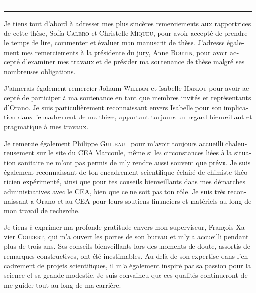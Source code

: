 \begin{otherlanguage}{french}

\hrule\relax
\vspace*{.9\baselineskip}%
\raggedright{\huge{}}\par%
\vspace*{1.1\baselineskip}%
\hrule\relax
\vspace*{\baselineskip}%
\thispagestyle{empty}

\begingroup
\itshape

Je tiens tout d'abord à adresser mes plus sincères remerciements aux rapportrices de cette thèse, Sof{\'{i}}a \textsc{Calero} et Christelle \textsc{Miqueu}, pour avoir accepté de prendre le temps de lire, commenter et évaluer mon manuscrit de thèse.
J'adresse également mes remerciements à la présidente du jury, Anne \textsc{Boutin}, pour avoir accepté d'examiner mes travaux et de présider ma soutenance de thèse malgré ses nombreuses obligations.

J'aimerais également remercier Johann \textsc{William} et Isabelle \textsc{Hablot} pour avoir accepté de participer à ma soutenance en tant que membres invités et représentants d'Orano. Je suis particulièrement reconnaissant envers Isabelle pour son implication dans l'encadrement de ma thèse, apportant toujours un regard bienveillant et pragmatique à mes travaux.

Je remercie également Philippe \textsc{Guilbaud} pour m'avoir toujours accueilli chaleureusement sur le site du CEA Marcoule, même si les circonstances liées à la situation sanitaire ne m'ont pas permis de m'y rendre aussi souvent que prévu. Je suis également reconnaissant de ton encadrement scientifique éclairé de chimiste théoricien expérimenté, ainsi que pour tes conseils bienveillants dans mes démarches administratives avec le CEA, bien que ce ne soit pas ton rôle. Je suis très reconnaissant à Orano et au CEA pour leurs soutiens financiers et matériels au long de mon travail de recherche.

Je tiens à exprimer ma profonde gratitude envers mon superviseur, François-Xavier \textsc{Coudert}, qui m'a ouvert les portes de son bureau et m'y a accueilli pendant plus de trois ans. Ses conseils bienveillants lors des moments de doute, assortis de remarques constructives, ont été inestimables. Au-delà de son expertise dans l'encadrement de projets scientifiques, il m'a également inspiré par sa passion pour la science et sa grande modestie. Je suis convaincu que ces qualités continueront de me guider tout au long de ma carrière.


\end{otherlanguage}
